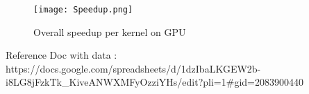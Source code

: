 \documentclass[14pt,fleqn]{article}
\begin{document}
\begin{figure}
\centering
    \texttt{[image: Speedup.png]}
    \caption{Overall speedup per kernel on GPU}
    \label{fig:Speedup}
\end{figure}





Reference Doc with data : https://docs.google.com/spreadsheets/d/1dzIbaLKGEW2b-i8LG8jFzkTk\_KiveANWXMFyOzziYHs/edit?pli=1\#gid=2083900440
\end{document}
